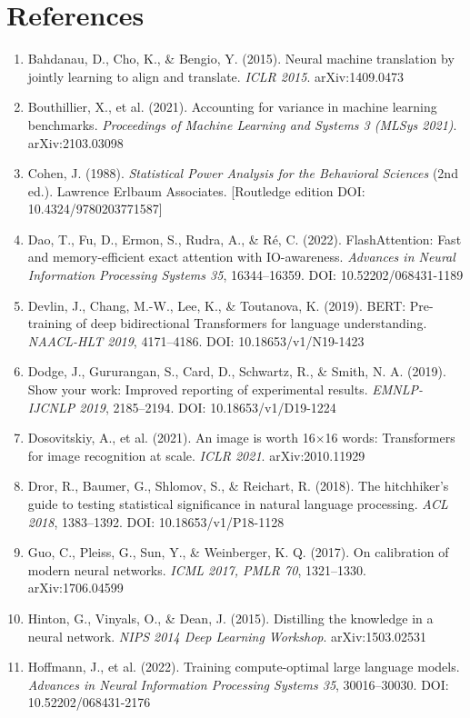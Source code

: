 \documentclass[11pt,a4paper]{article}
\begin{document}
\section{References}

\footnotesize
\begin{enumerate}[leftmargin=1.5em,itemsep=1pt]
\item Bahdanau, D., Cho, K., \& Bengio, Y. (2015). Neural machine translation by jointly learning to align and translate. \emph{ICLR 2015}. arXiv:1409.0473
\item Bouthillier, X., et al. (2021). Accounting for variance in machine learning benchmarks. \emph{Proceedings of Machine Learning and Systems 3 (MLSys 2021)}. arXiv:2103.03098
\item Cohen, J. (1988). \emph{Statistical Power Analysis for the Behavioral Sciences} (2nd ed.). Lawrence Erlbaum Associates. [Routledge edition DOI: 10.4324/9780203771587]
\item Dao, T., Fu, D., Ermon, S., Rudra, A., \& Ré, C. (2022). FlashAttention: Fast and memory-efficient exact attention with IO-awareness. \emph{Advances in Neural Information Processing Systems 35}, 16344--16359. DOI: 10.52202/068431-1189
\item Devlin, J., Chang, M.-W., Lee, K., \& Toutanova, K. (2019). BERT: Pre-training of deep bidirectional Transformers for language understanding. \emph{NAACL-HLT 2019}, 4171--4186. DOI: 10.18653/v1/N19-1423
\item Dodge, J., Gururangan, S., Card, D., Schwartz, R., \& Smith, N. A. (2019). Show your work: Improved reporting of experimental results. \emph{EMNLP-IJCNLP 2019}, 2185--2194. DOI: 10.18653/v1/D19-1224
\item Dosovitskiy, A., et al. (2021). An image is worth 16$\times$16 words: Transformers for image recognition at scale. \emph{ICLR 2021}. arXiv:2010.11929
\item Dror, R., Baumer, G., Shlomov, S., \& Reichart, R. (2018). The hitchhiker's guide to testing statistical significance in natural language processing. \emph{ACL 2018}, 1383--1392. DOI: 10.18653/v1/P18-1128
\item Guo, C., Pleiss, G., Sun, Y., \& Weinberger, K. Q. (2017). On calibration of modern neural networks. \emph{ICML 2017, PMLR 70}, 1321--1330. arXiv:1706.04599
\item Hinton, G., Vinyals, O., \& Dean, J. (2015). Distilling the knowledge in a neural network. \emph{NIPS 2014 Deep Learning Workshop}. arXiv:1503.02531
\item Hoffmann, J., et al. (2022). Training compute-optimal large language models. \emph{Advances in Neural Information Processing Systems 35}, 30016--30030. DOI: 10.52202/068431-2176

\end{enumerate}
\end{document}
